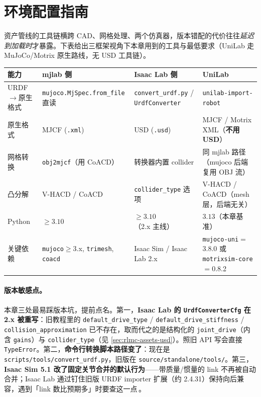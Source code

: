 \section{环境配置指南}
\label{sec:rlmc-assets-prep}

资产管线的工具链横跨 CAD、网格处理、两个仿真器，版本错配的代价往往\emph{延迟到加载时}才暴露。下表给出三框架视角下本章用到的工具与最低要求（UniLab 走 MuJoCo/Motrix 原生路线，无 USD 工具链）。

\begin{center}
\small
\begin{tabular}{@{}llll@{}}
\toprule
能力 & mjlab 侧 & Isaac Lab 侧 & UniLab \\
\midrule
URDF$\to$原生格式 & \texttt{mujoco.MjSpec.from\_file} 直读 & \texttt{convert\_urdf.py} / \texttt{UrdfConverter} & \texttt{unilab-import-robot} \\
原生格式 & MJCF (\texttt{.xml}) & USD (\texttt{.usd}) & MJCF / Motrix XML（\textbf{不用 USD}） \\
网格转换 & \texttt{obj2mjcf}（用 CoACD） & 转换器内置 collider & 同 mjlab 路径（mujoco 后端复用 OBJ 流） \\
凸分解 & V-HACD / CoACD & \texttt{collider\_type} 选项 & V-HACD / CoACD（mesh 层，后端无关） \\
Python & $\ge 3.10$ & $\ge 3.10$（2.x 主线） & $3.13$（本章基准） \\
关键依赖 & \texttt{mujoco}$\ge$3.x, \texttt{trimesh}, \texttt{coacd} & Isaac Sim / Isaac Lab 2.x & \texttt{mujoco-uni}$=$3.8.0 或 \texttt{motrixsim-core}$=$0.8.2 \\
\bottomrule
\end{tabular}
\end{center}

\paragraph{版本敏感点。}本章三处最易踩版本坑，提前点名。第一，\textbf{Isaac Lab 的 \texttt{UrdfConverterCfg} 在 2.x 被重写}：旧教程里的 \verb|default_drive_type| / \verb|default_drive_stiffness| / \verb|collision_approximation| 已不存在，取而代之的是结构化的 \verb|joint_drive|（内含 \verb|gains|）与 \verb|collider_type|（见 \cref{sec:rlmc-assets-usd}）。照旧 API 写会直接 \verb|TypeError|。第二，\textbf{命令行转换脚本路径变了}：现在是 \verb|scripts/tools/convert_urdf.py|，旧版在 \verb|source/standalone/tools/|。第三，\textbf{Isaac Sim 5.1 改了固定关节合并的默认行为}——带质量/惯量的 link 不再被自动合并；Isaac Lab 通过钉住旧版 URDF importer 扩展（约 2.4.31）保持向后兼容，遇到「link 数比预期多」时要查这一点\,\cite{isaaclab2024}。

